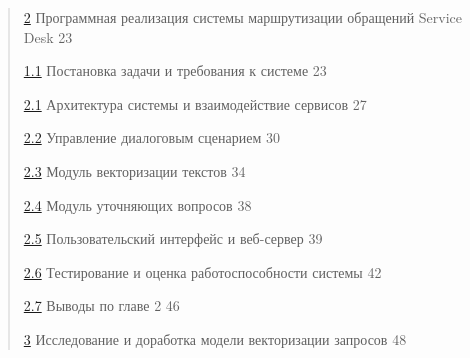 \documentclass[
]{article}
\begin{document}
\begin{quote}
\protect\hyperlink{ux43fux440ux43eux433ux440ux430ux43cux43cux43dux430ux44f-ux440ux435ux430ux43bux438ux437ux430ux446ux438ux44f-ux441ux438ux441ux442ux435ux43cux44b-ux43cux430ux440ux448ux440ux443ux442ux438ux437ux430ux446ux438ux438-ux43eux431ux440ux430ux449ux435ux43dux438ux439-service-desk}{2}
Программная реализация системы маршрутизации обращений Service Desk 23

\protect\hyperlink{ux43fux43eux441ux442ux430ux43dux43eux432ux43aux430-ux437ux430ux434ux430ux447ux438-ux438-ux442ux440ux435ux431ux43eux432ux430ux43dux438ux44f-ux43a-ux441ux438ux441ux442ux435ux43cux435}{1.1}
Постановка задачи и требования к системе 23

\protect\hyperlink{ux430ux440ux445ux438ux442ux435ux43aux442ux443ux440ux430-ux441ux438ux441ux442ux435ux43cux44b-ux438-ux432ux437ux430ux438ux43cux43eux434ux435ux439ux441ux442ux432ux438ux435-ux441ux435ux440ux432ux438ux441ux43eux432}{2.1}
Архитектура системы и взаимодействие сервисов 27

\protect\hyperlink{ux443ux43fux440ux430ux432ux43bux435ux43dux438ux435-ux434ux438ux430ux43bux43eux433ux43eux432ux44bux43c-ux441ux446ux435ux43dux430ux440ux438ux435ux43c}{2.2}
Управление диалоговым сценарием 30

\protect\hyperlink{ux43cux43eux434ux443ux43bux44c-ux432ux435ux43aux442ux43eux440ux438ux437ux430ux446ux438ux438-ux442ux435ux43aux441ux442ux43eux432}{2.3}
Модуль векторизации текстов 34

\protect\hyperlink{ux43cux43eux434ux443ux43bux44c-ux443ux442ux43eux447ux43dux44fux44eux449ux438ux445-ux432ux43eux43fux440ux43eux441ux43eux432}{2.4}
Модуль уточняющих вопросов 38

\protect\hyperlink{ux43fux43eux43bux44cux437ux43eux432ux430ux442ux435ux43bux44cux441ux43aux438ux439-ux438ux43dux442ux435ux440ux444ux435ux439ux441-ux438-ux432ux435ux431-ux441ux435ux440ux432ux435ux440}{2.5}
Пользовательский интерфейс и веб-сервер 39

\protect\hyperlink{ux442ux435ux441ux442ux438ux440ux43eux432ux430ux43dux438ux435-ux438-ux43eux446ux435ux43dux43aux430-ux440ux430ux431ux43eux442ux43eux441ux43fux43eux441ux43eux431ux43dux43eux441ux442ux438-ux441ux438ux441ux442ux435ux43cux44b}{2.6}
Тестирование и оценка работоспособности системы 42

\protect\hyperlink{ux432ux44bux432ux43eux434ux44b-ux43fux43e-ux433ux43bux430ux432ux435-2}{2.7}
Выводы по главе 2 46

\protect\hyperlink{ux438ux441ux441ux43bux435ux434ux43eux432ux430ux43dux438ux435-ux438-ux434ux43eux440ux430ux431ux43eux442ux43aux430-ux43cux43eux434ux435ux43bux438-ux432ux435ux43aux442ux43eux440ux438ux437ux430ux446ux438ux438-ux437ux430ux43fux440ux43eux441ux43eux432}{3}
Исследование и доработка модели векторизации запросов 48


\end{quote}
\end{document}
